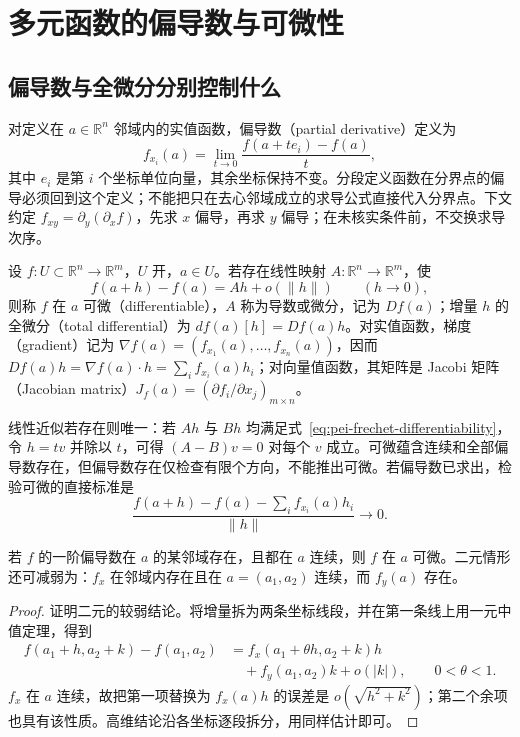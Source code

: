 \section{多元函数的偏导数与可微性}
\label{sec:pei-partials-differentiability}

\subsection{偏导数与全微分分别控制什么}

对定义在 $a\in\mathbb R^n$ 邻域内的实值函数，偏导数（partial derivative）定义为
\[
f_{x_i}(a)=\lim_{t\to0}\frac{f(a+te_i)-f(a)}{t},
\]
其中 $e_i$ 是第 $i$ 个坐标单位向量，其余坐标保持不变。分段定义函数在分界点的偏导必须回到这个定义；不能把只在去心邻域成立的求导公式直接代入分界点。下文约定 $f_{xy}=\partial_y(\partial_x f)$，先求 $x$ 偏导，再求 $y$ 偏导；在未核实条件前，不交换求导次序。

\begin{definition}
设 $f:U\subset\mathbb R^n\to\mathbb R^m$，$U$ 开，$a\in U$。若存在线性映射 $A:\mathbb R^n\to\mathbb R^m$，使
\begin{equation}
\label{eq:pei-frechet-differentiability}
f(a+h)-f(a)=Ah+o(\|h\|)\qquad(h\to0),
\end{equation}
则称 $f$ 在 $a$ 可微（differentiable），$A$ 称为导数或微分，记为 $Df(a)$；增量 $h$ 的全微分（total differential）为 $df(a)[h]=Df(a)h$。对实值函数，梯度（gradient）记为 $\nabla f(a)=(f_{x_1}(a),\ldots,f_{x_n}(a))$，因而 $Df(a)h=\nabla f(a)\cdot h=\sum_i f_{x_i}(a)h_i$；对向量值函数，其矩阵是 Jacobi 矩阵（Jacobian matrix）$J_f(a)=(\partial f_i/\partial x_j)_{m\times n}$。
\end{definition}

线性近似若存在则唯一：若 $Ah$ 与 $Bh$ 均满足式~\eqref{eq:pei-frechet-differentiability}，令 $h=tv$ 并除以 $t$，可得 $(A-B)v=0$ 对每个 $v$ 成立。可微蕴含连续和全部偏导数存在，但偏导数存在仅检查有限个方向，不能推出可微。若偏导数已求出，检验可微的直接标准是
\begin{equation}
\label{eq:pei-differentiability-test}
\frac{f(a+h)-f(a)-\sum_i f_{x_i}(a)h_i}{\|h\|}\longrightarrow0.
\end{equation}

\begin{theorem}
\label{thm:pei-continuous-partials}
若 $f$ 的一阶偏导数在 $a$ 的某邻域存在，且都在 $a$ 连续，则 $f$ 在 $a$ 可微。二元情形还可减弱为：$f_x$ 在邻域内存在且在 $a=(a_1,a_2)$ 连续，而 $f_y(a)$ 存在。
\end{theorem}
\begin{proof}
证明二元的较弱结论。将增量拆为两条坐标线段，并在第一条线上用一元中值定理，得到
\begin{align*}
f(a_1+h,a_2+k)-f(a_1,a_2)
&=f_x(a_1+\theta h,a_2+k)h\\
&\quad+f_y(a_1,a_2)k+o(|k|),\qquad 0<\theta<1.
\end{align*}
$f_x$ 在 $a$ 连续，故把第一项替换为 $f_x(a)h$ 的误差是 $o(\sqrt{h^2+k^2})$；第二个余项也具有该性质。高维结论沿各坐标逐段拆分，用同样估计即可。
\end{proof}

